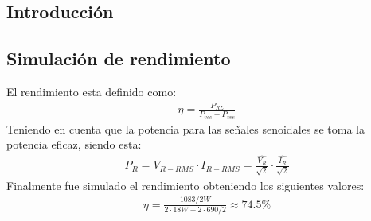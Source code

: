 



\subsection{Introducción}

\subsection{Simulación de  rendimiento}
El rendimiento esta definido como:
\begin{align}
\eta = \frac{P_{RL}}{P_{vcc}+P_{vee}}
\end{align}
Teniendo en cuenta que la potencia para las señales senoidales se toma la potencia eficaz, siendo esta:
\begin{align}
P_{R}=V_{R-RMS}\cdot I_{R-RMS} =\frac{\hat{V_{R}}}{\sqrt{2}} \cdot \frac{\hat{I_{R}}}{\sqrt{2}}
\end{align}
Finalmente fue simulado el rendimiento obteniendo los siguientes valores:
\begin{align}
\eta=\frac{1083 / 2 W}{ 2\cdot 18 W + 2 \cdot 690 /2}\approx 74.5 \%
\end{align}
